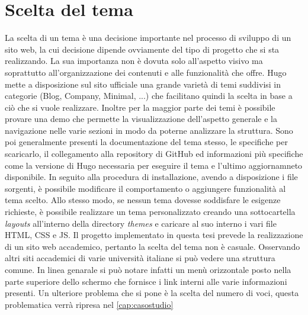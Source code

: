 \documentclass[target=bach,aauheader=]{thud}
\begin{document}
\section{Scelta del tema}\label{sec:tema}
La scelta di un tema è una decisione importante nel processo di sviluppo di un sito web, la cui decisione dipende ovviamente del tipo di progetto che si sta realizzando. 
La sua importanza non è dovuta solo all'aspetto visivo ma soprattutto all'organizzazione dei contenuti e alle funzionalità che offre.
\newline
Hugo mette a disposizione sul sito ufficiale una grande varietà di temi suddivisi in categorie (Blog, Company, Minimal, ...) che facilitano quindi la scelta in base a ciò che si vuole realizzare. 
Inoltre per la maggior parte dei temi è possibile provare una demo che permette la visualizzazione dell'aspetto generale e la navigazione nelle varie sezioni in modo da poterne analizzare la struttura. Sono poi generalmente presenti la documentazione del tema stesso, le specifiche per scaricarlo, il collegamento alla repository di GitHub
ed informazioni più specifiche come la versione di Hugo necessaria per eseguire il tema e l'ultimo aggiornamneto disponibile.
\newline
In seguito alla procedura di installazione, avendo a disposizione i file sorgenti, è possibile modificare il comportamento o aggiungere funzionalità al tema scelto. Allo stesso modo, se nessun tema dovesse soddisfare le esigenze richieste, è possibile realizzare un tema personalizzato creando una sottocartella \textit{layouts} all'interno della directory \textit{themes}
e caricare al suo interno i vari file HTML, CSS e JS.
\newline
Il progetto implementato in questa tesi prevede la realizzazione di un sito web accademico, pertanto la scelta del tema non è casuale. Osservando altri siti accademici di varie università italiane si può vedere una struttura comune.
In linea genarale si può notare infatti un menù orizzontale posto nella parte superiore dello schermo che fornisce i link interni alle varie informazioni presenti.
Un ulteriore problema che si pone è la scelta del numero di voci, questa problematica verrà ripresa nel \cref{cap:casostudio} 
\end{document}
